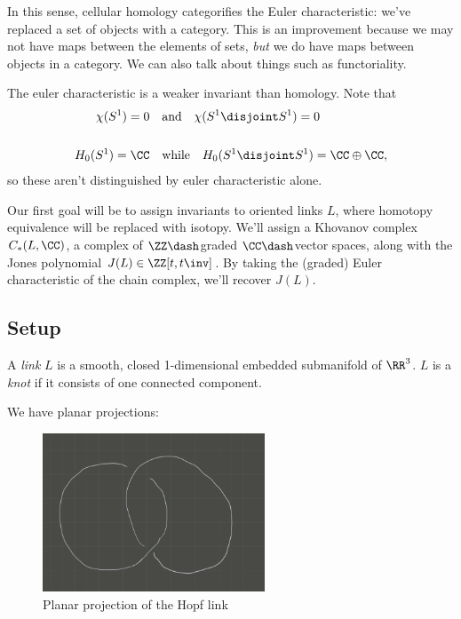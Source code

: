 In this sense, cellular homology categorifies the Euler characteristic:
we've replaced a set of objects with a category. This is an improvement
because we may not have maps between the elements of sets, \emph{but} we
do have maps between objects in a category. We can also talk about
things such as functoriality.

\begin{example}

The euler characteristic is a weaker invariant than homology. Note that
\begin{align*}  
\chi(S^1) = 0 &\quad\text{and}\quad \chi(S^1\disjoint S^1) = 0 \\ \\ 
H_0(S^1) = \CC &\quad\text{while}\quad H_0(S^1\disjoint S^1) = \CC\oplus \CC
,\end{align*} so these aren't distinguished by euler characteristic
alone.

\end{example}

Our first goal will be to assign invariants to oriented links \(L\),
where homotopy equivalence will be replaced with isotopy. We'll assign a
Khovanov complex \(C_*(L,\CC)\), a complex of \(\ZZ\dash\)graded
\(\CC\dash\)vector spaces, along with the Jones polynomial
\(J(L) \in \ZZ[t, t\inv]\). By taking the (graded) Euler characteristic
of the chain complex, we'll recover \(J(L)\).

\hypertarget{setup}{%
\subsection{Setup}\label{setup}}

\begin{definition}

A \emph{link} \(L\) is a smooth, closed 1-dimensional embedded
submanifold of \(\RR^3\). \(L\) is a \emph{knot} if it consists of one
connected component.

\end{definition}

We have planar projections:

\begin{figure}
\centering
\includegraphics[width=2.60417in,height=\textheight]{figures/image_2020-07-06-11-30-13.png}
\caption{Planar projection of the Hopf link}
\end{figure}

